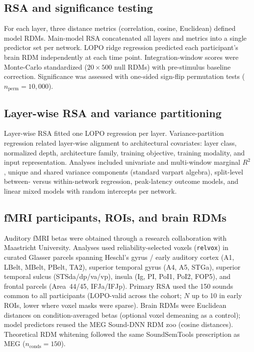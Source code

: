 \documentclass[11pt,a4paper]{article}
\begin{document}
\subsection{RSA and significance testing}
For each layer, three distance metrics (correlation, cosine, Euclidean) defined model RDMs. Main-model RSA concatenated all layers and metrics into a single predictor set per network. LOPO ridge regression predicted each participant's brain RDM independently at each time point. Integration-window scores were Monte-Carlo standardized ($20 \times 500$ null RDMs) with pre-stimulus baseline correction. Significance was assessed with one-sided sign-flip permutation tests ($n_{\mathrm{perm}}=10{,}000$).

\subsection{Layer-wise RSA and variance partitioning}
Layer-wise RSA fitted one LOPO regression per layer. Variance-partition regression related layer-wise alignment to architectural covariates: layer class, normalized depth, architecture family, training objective, training modality, and input representation. Analyses included univariate and multi-window marginal $R^2$, unique and shared variance components (standard varpart algebra), split-level between- versus within-network regression, peak-latency outcome models, and linear mixed models with random intercepts per network.

\subsection{fMRI participants, ROIs, and brain RDMs}
Auditory fMRI betas were obtained through a research collaboration with Maastricht University. Analyses used reliability-selected voxels (\texttt{relvox}) in curated Glasser parcels spanning Heschl's gyrus / early auditory cortex (A1, LBelt, MBelt, PBelt, TA2), superior temporal gyrus (A4, A5, STGa), superior temporal sulcus (STSda/dp/va/vp), insula (Ig, PI, PoI1, PoI2, FOP5), and frontal parcels (Area~44/45, IFJa/IFJp). Primary RSA used the 150 sounds common to all participants (LOPO-valid across the cohort; $N$ up to 10 in early ROIs, lower where voxel masks were sparse). Brain RDMs were Euclidean distances on condition-averaged betas (optional voxel demeaning as a control); model predictors reused the MEG Sound-DNN RDM zoo (cosine distances). Theoretical RDM whitening followed the same SoundSemTools prescription as MEG ($n_{\mathrm{conds}}=150$).
\end{document}
